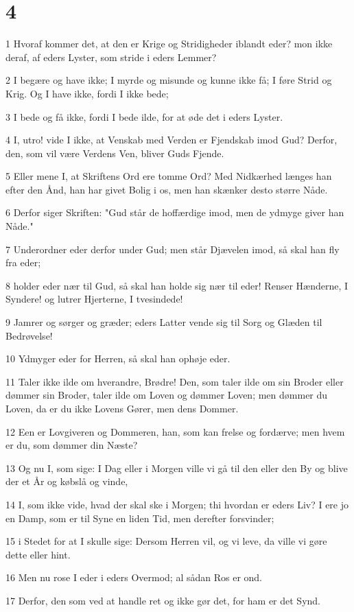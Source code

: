 \chapter{4}

\par 1 Hvoraf kommer det, at den er Krige og Stridigheder iblandt eder? mon ikke deraf, af eders Lyster, som stride i eders Lemmer?
\par 2 I begære og have ikke; I myrde og misunde og kunne ikke få; I føre Strid og Krig. Og I have ikke, fordi I ikke bede;
\par 3 I bede og få ikke, fordi I bede ilde, for at øde det i eders Lyster.
\par 4 I, utro! vide I ikke, at Venskab med Verden er Fjendskab imod Gud? Derfor, den, som vil være Verdens Ven, bliver Guds Fjende.
\par 5 Eller mene I, at Skriftens Ord ere tomme Ord? Med Nidkærhed længes han efter den Ånd, han har givet Bolig i os, men han skænker desto større Nåde.
\par 6 Derfor siger Skriften: "Gud står de hoffærdige imod, men de ydmyge giver han Nåde."
\par 7 Underordner eder derfor under Gud; men står Djævelen imod, så skal han fly fra eder;
\par 8 holder eder nær til Gud, så skal han holde sig nær til eder! Renser Hænderne, I Syndere! og lutrer Hjerterne, I tvesindede!
\par 9 Jamrer og sørger og græder; eders Latter vende sig til Sorg og Glæden til Bedrøvelse!
\par 10 Ydmyger eder for Herren, så skal han ophøje eder.
\par 11 Taler ikke ilde om hverandre, Brødre! Den, som taler ilde om sin Broder eller dømmer sin Broder, taler ilde om Loven og dømmer Loven; men dømmer du Loven, da er du ikke Lovens Gører, men dens Dommer.
\par 12 Een er Lovgiveren og Dommeren, han, som kan frelse og fordærve; men hvem er du, som dømmer din Næste?
\par 13 Og nu I, som sige: I Dag eller i Morgen ville vi gå til den eller den By og blive der et År og købslå og vinde,
\par 14 I, som ikke vide, hvad der skal ske i Morgen; thi hvordan er eders Liv? I ere jo en Damp, som er til Syne en liden Tid, men derefter forsvinder;
\par 15 i Stedet for at I skulle sige: Dersom Herren vil, og vi leve, da ville vi gøre dette eller hint.
\par 16 Men nu rose I eder i eders Overmod; al sådan Ros er ond.
\par 17 Derfor, den som ved at handle ret og ikke gør det, for ham er det Synd.

